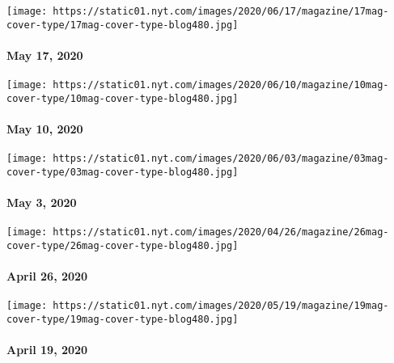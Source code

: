 \href{https://www.nytimes.com/issue/magazine/2020/05/24/the-51720-issue}{}

\texttt{[image: https://static01.nyt.com/images/2020/06/17/magazine/17mag-cover-type/17mag-cover-type-blog480.jpg]}

\hypertarget{may-17-2020}{%
\paragraph{May 17, 2020}\label{may-17-2020}}

\href{https://www.nytimes.com/issue/magazine/2020/05/07/the-51020-issue}{}

\texttt{[image: https://static01.nyt.com/images/2020/06/10/magazine/10mag-cover-type/10mag-cover-type-blog480.jpg]}

\hypertarget{may-10-2020}{%
\paragraph{May 10, 2020}\label{may-10-2020}}

\href{https://www.nytimes.com/issue/magazine/2020/04/30/the-5320-issue}{}

\texttt{[image: https://static01.nyt.com/images/2020/06/03/magazine/03mag-cover-type/03mag-cover-type-blog480.jpg]}

\hypertarget{may-3-2020}{%
\paragraph{May 3, 2020}\label{may-3-2020}}

\href{https://www.nytimes.com/issue/magazine/2020/04/23/the-42620-issue}{}

\texttt{[image: https://static01.nyt.com/images/2020/04/26/magazine/26mag-cover-type/26mag-cover-type-blog480.jpg]}

\hypertarget{april-26-2020}{%
\paragraph{April 26, 2020}\label{april-26-2020}}

\href{https://www.nytimes.com/issue/magazine/2020/04/17/the-41920-issue}{}

\texttt{[image: https://static01.nyt.com/images/2020/05/19/magazine/19mag-cover-type/19mag-cover-type-blog480.jpg]}

\hypertarget{april-19-2020}{%
\paragraph{April 19, 2020}\label{april-19-2020}}

